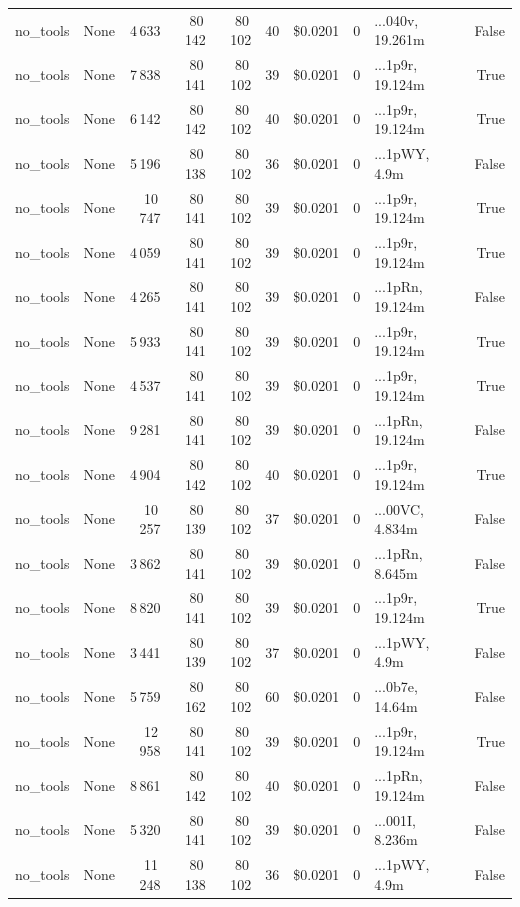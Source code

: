 \documentclass[a4paper,11pt]{article}
\begin{document}
\begin{table}[H]
{\begin{tabular}{l r r r r r r r l r}
no\_tools & None & 4\,633 & 80\,142 & 80\,102 & 40 & \$0.0201 & 0 & ...040v, 19.261m & False \\
no\_tools & None & 7\,838 & 80\,141 & 80\,102 & 39 & \$0.0201 & 0 & ...1p9r, 19.124m & True \\
no\_tools & None & 6\,142 & 80\,142 & 80\,102 & 40 & \$0.0201 & 0 & ...1p9r, 19.124m & True \\
no\_tools & None & 5\,196 & 80\,138 & 80\,102 & 36 & \$0.0201 & 0 & ...1pWY, 4.9m & False \\
no\_tools & None & 10\,747 & 80\,141 & 80\,102 & 39 & \$0.0201 & 0 & ...1p9r, 19.124m & True \\
no\_tools & None & 4\,059 & 80\,141 & 80\,102 & 39 & \$0.0201 & 0 & ...1p9r, 19.124m & True \\
no\_tools & None & 4\,265 & 80\,141 & 80\,102 & 39 & \$0.0201 & 0 & ...1pRn, 19.124m & False \\
no\_tools & None & 5\,933 & 80\,141 & 80\,102 & 39 & \$0.0201 & 0 & ...1p9r, 19.124m & True \\
no\_tools & None & 4\,537 & 80\,141 & 80\,102 & 39 & \$0.0201 & 0 & ...1p9r, 19.124m & True \\
no\_tools & None & 9\,281 & 80\,141 & 80\,102 & 39 & \$0.0201 & 0 & ...1pRn, 19.124m & False \\
no\_tools & None & 4\,904 & 80\,142 & 80\,102 & 40 & \$0.0201 & 0 & ...1p9r, 19.124m & True \\
no\_tools & None & 10\,257 & 80\,139 & 80\,102 & 37 & \$0.0201 & 0 & ...00VC, 4.834m & False \\
no\_tools & None & 3\,862 & 80\,141 & 80\,102 & 39 & \$0.0201 & 0 & ...1pRn, 8.645m & False \\
no\_tools & None & 8\,820 & 80\,141 & 80\,102 & 39 & \$0.0201 & 0 & ...1p9r, 19.124m & True \\
no\_tools & None & 3\,441 & 80\,139 & 80\,102 & 37 & \$0.0201 & 0 & ...1pWY, 4.9m & False \\
no\_tools & None & 5\,759 & 80\,162 & 80\,102 & 60 & \$0.0201 & 0 & ...0b7e, 14.64m & False \\
no\_tools & None & 12\,958 & 80\,141 & 80\,102 & 39 & \$0.0201 & 0 & ...1p9r, 19.124m & True \\
no\_tools & None & 8\,861 & 80\,142 & 80\,102 & 40 & \$0.0201 & 0 & ...1pRn, 19.124m & False \\
no\_tools & None & 5\,320 & 80\,141 & 80\,102 & 39 & \$0.0201 & 0 & ...001I, 8.236m & False \\
no\_tools & None & 11\,248 & 80\,138 & 80\,102 & 36 & \$0.0201 & 0 & ...1pWY, 4.9m & False \\

\end{tabular}}
\end{table}
\end{document}
